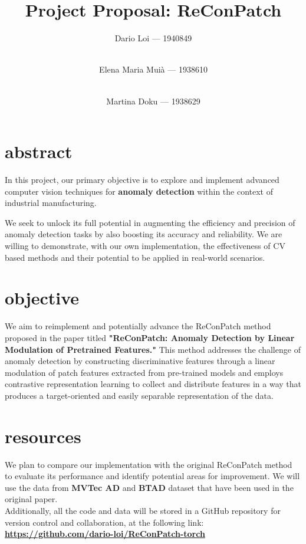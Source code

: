 \documentclass[journal,10pt,onecolumn,draftclsnofoot,]{IEEEtran}
\author{
    Dario Loi --- 1940849 \and \\
    Elena Maria Muià --- 1938610 \and \\
    Martina Doku --- 1938629
}
\title{Project Proposal: ReConPatch}
\begin{document}
\maketitle
\section{abstract}

In this project, our primary objective is to explore and implement advanced computer
 vision techniques for \textbf{anomaly detection} within the context of industrial manufacturing. 

We seek to unlock its full potential in augmenting the 
efficiency and precision of anomaly detection tasks by also boosting its accuracy and reliability.
We are willing to demonstrate, with our own implementation, the effectiveness of CV based methods and their potential to be applied in real-world scenarios.
\section{objective}
We aim to reimplement and potentially advance the ReConPatch method 
     proposed in the paper titled \textbf{"ReConPatch: Anomaly Detection by Linear Modulation of
      Pretrained Features."} \cite{ReConPatch}
      This method addresses the challenge of anomaly detection by 
      constructing discriminative features through a linear modulation of patch features
       extracted from pre-trained models and employs contrastive representation learning to collect and distribute features in a way
       that produces a target-oriented and easily separable representation of the data.
\section{resources}
 We plan to compare our implementation with the original ReConPatch method
      to evaluate its performance and identify potential areas for improvement.
       We will use the data from \textbf{MVTec AD}\cite{MVTec AD} and \textbf{BTAD}\cite{BTAD} dataset that have been used in the original paper.\\
       Additionally, all the code and data will be stored in a GitHub repository for version control and collaboration,
       at the following link: \textbf{\url{https://github.com/dario-loi/ReConPatch-torch}}
    
    
\end{document}
